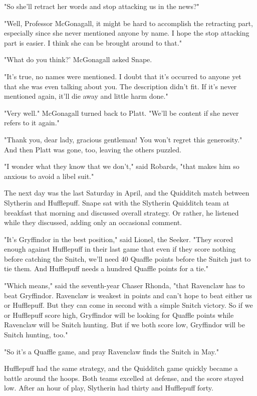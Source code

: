 \documentclass[a4paper,11pt]{article}
\begin{document}
"So she'll retract her words and stop attacking us in the news?"

"Well, Professor McGonagall, it might be hard to accomplish the retracting part, especially since she never mentioned anyone by name. I hope the stop attacking part is easier. I think she can be brought around to that."

"What do you think?' McGonagall asked Snape.

"It's true, no names were mentioned. I doubt that it's occurred to anyone yet that she was even talking about you. The description didn't fit. If it's never mentioned again, it'll die away and little harm done."

"Very well." McGonagall turned back to Platt. "We'll be content if she never refers to it again."

"Thank you, dear lady, gracious gentleman! You won't regret this generosity." And then Platt was gone, too, leaving the others puzzled.

"I wonder what they know that we don't," said Robards, "that makes him so anxious to avoid a libel suit."

The next day was the last Saturday in April, and the Quidditch match between Slytherin and Hufflepuff. Snape sat with the Slytherin Quidditch team at breakfast that morning and discussed overall strategy. Or rather, he listened while they discussed, adding only an occasional comment.

"It's Gryffindor in the best position," said Lionel, the Seeker. "They scored enough against Hufflepuff in their last game that even if they score nothing before catching the Snitch, we'll need 40 Quaffle points before the Snitch just to tie them. And Hufflepuff needs a hundred Quaffle points for a tie."

"Which means," said the seventh-year Chaser Rhonda, "that Ravenclaw has to beat Gryffindor. Ravenclaw is weakest in points and can't hope to beat either us or Hufflepuff. But they can come in second with a simple Snitch victory. So if we or Hufflepuff score high, Gryffindor will be looking for Quaffle points while Ravenclaw will be Snitch hunting. But if we both score low, Gryffindor will be Snitch hunting, too."

"So it's a Quaffle game, and pray Ravenclaw finds the Snitch in May."

Hufflepuff had the same strategy, and the Quidditch game quickly became a battle around the hoops. Both teams excelled at defense, and the score stayed low. After an hour of play, Slytherin had thirty and Hufflepuff forty.
\end{document}
